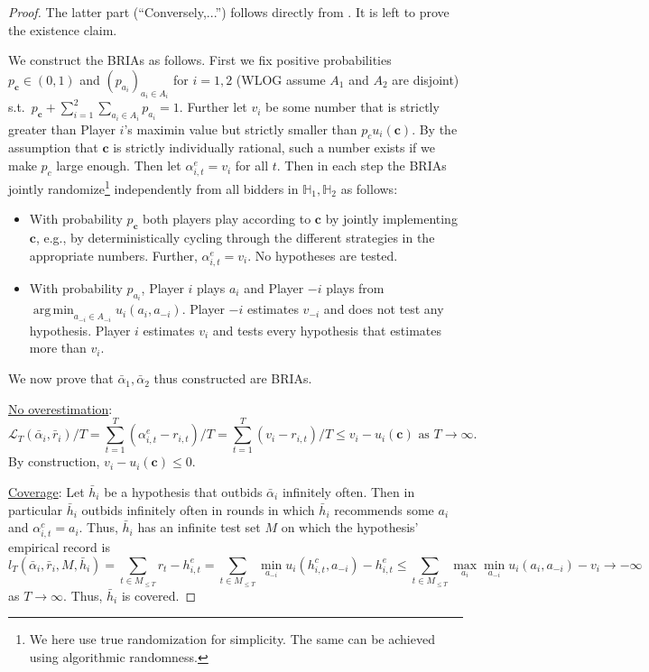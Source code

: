 \documentclass[submission,copyright,creativecommons]{eptcs}
\DeclareMathOperator*{\argmin}{arg\,min}
\begin{document}
%

\begin{proof}
    The latter part (\enquote{Conversely,...}) follows directly from . It is left to prove the existence claim.

    We construct the BRIAs as follows. First we fix positive probabilities $p_{\mathbf{c}}\in (0,1)$ and $(p_{a_i})_{a_i\in A_i}$ for $i=1,2$ (WLOG assume $A_1$ and $A_2$ are disjoint) s.t.\ $p_{\mathbf c}+\sum_{i=1}^2 \sum_{a_i\in A_i} p_{a_i} = 1$. Further let $v_i$ be some number that is strictly greater than Player $i$'s maximin value but strictly smaller than $p_c u_i(\mathbf{c})$. By the assumption that $\mathbf{c}$ is strictly individually rational, such a number exists if we make $p_c$ large enough. Then let $\alpha_{i,t}^e=v_i$ for all $t$. Then in each step the BRIAs jointly randomize\footnote{We here use true randomization for simplicity. The same can be achieved using algorithmic randomness.} independently from all bidders in $\mathbb{H}_1,\mathbb{H}_2$ as follows:
    \begin{itemize}
        \item With probability $p_{\mathbf{c}}$ both players play according to $\mathbf{c}$ by jointly implementing $\mathbf{c}$, e.g., by deterministically cycling through the different strategies in the appropriate numbers.%
        Further, $\alpha_{i,t}^e=v_i$. No hypotheses are tested.
        \item With probability $p_{a_i}$, Player $i$ plays $a_i$ and Player $-i$ plays from $\argmin_{a_{-i}\in A_{-i}} u_i(a_i,a_{-i})$. Player $-i$ estimates $v_{-i}$ and does not test any hypothesis. Player $i$ estimates $v_i$ and tests every hypothesis that estimates more than $v_i$.
    \end{itemize}
We now prove that $\bar \alpha_1,\bar \alpha_2$ thus constructed are BRIAs.

\underline{No overestimation}: 
\begin{equation*}
    \mathcal{L}_T(\bar \alpha_i,\bar r_i)/T = \sum_{t=1}^T (\alpha_{i,t}^e - r_{i,t})/T = \sum_{t=1}^T (v_i - r_{i,t})/T \leq v_i - u_i(\mathbf{c}) \text { as } T\rightarrow \infty.
\end{equation*}
By construction, $v_i - u_i(\mathbf{c})\leq 0$.

\underline{Coverage}:
Let $\bar h_i$ be a hypothesis that outbids $\bar\alpha_i$ infinitely often. Then in particular $\bar h_i$ outbids infinitely often in rounds in which $\bar h_i$ recommends some $a_i$ and $\alpha_{i,t}^c=a_i$. Thus, $\bar h_i$ has an infinite test set $M$ on which the hypothesis' empirical record is
\begin{equation*}
    l_T(\bar\alpha_i,\bar r_i, M, \bar h_i) = \sum_{t\in M_{\leq T}} r_t - h_{i,t}^e = \sum_{t\in M_{\leq T}} \min_{a_{-i}} u_i(h_{i,t}^c,a_{-i}) - h_{i,t}^e \leq \sum_{t\in M_{\leq T}} \max_{a_i}\min_{a_{-i}} u_i(a_i,a_{-i}) - v_i \rightarrow -\infty 
\end{equation*}
as $T\rightarrow \infty$.
Thus, $\bar h_i$ is covered.
\end{proof}
\end{document}
